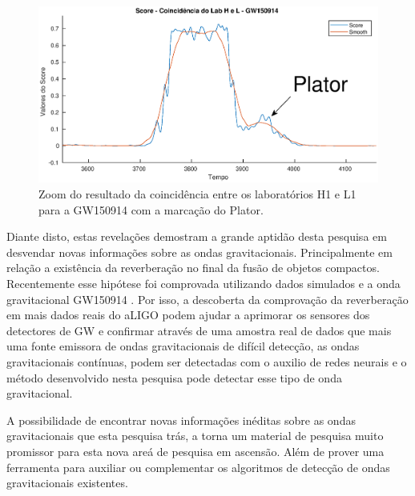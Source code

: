 \begin{figure}[H]
\centering
\includegraphics[width=1\textwidth]{figuras/GW150914_LabHL_plator.eps}
\caption{Zoom do resultado da coincidência entre os laboratórios H1 e L1 para a GW150914 com a marcação do Plator.}
\label{fig:scoreHLPlator}
\end{figure}

Diante disto, estas revelações demostram a grande aptidão desta pesquisa em desvendar novas informações sobre as ondas gravitacionais. Principalmente em relação a existência da reverberação no final da fusão de objetos compactos. Recentemente esse hipótese foi comprovada utilizando dados simulados e a onda gravitacional GW150914 \cite{Giesler_2019}. Por isso, a descoberta da comprovação da reverberação em mais dados reais do aLIGO podem ajudar a aprimorar os sensores dos detectores de GW e confirmar através de uma amostra real de dados que mais uma fonte emissora de ondas gravitacionais de difícil detecção, as ondas gravitacionais contínuas, podem ser detectadas com o auxilio de redes neurais e o método desenvolvido nesta pesquisa pode detectar esse tipo de onda gravitacional.

A possibilidade de encontrar novas informações inéditas sobre as ondas gravitacionais que esta pesquisa trás, a torna um material de pesquisa muito promissor para esta nova areá de pesquisa em ascensão. Além de prover uma ferramenta para auxiliar ou complementar os algoritmos de detecção de ondas gravitacionais existentes.

